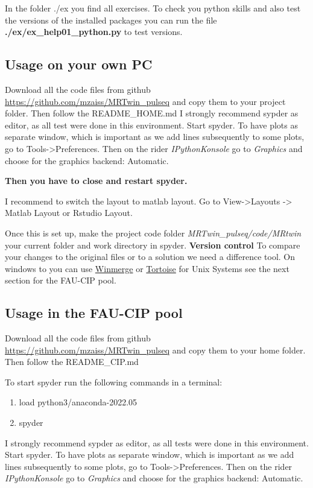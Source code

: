 \documentclass[a4paper,12pt]{extarticle}
\begin{document}
In the folder ./ex you find all exercises. 
To check you python skills and also test the versions of the installed packages you can run the file \textbf{./ex/ex\_help01\_python.py} to test versions.

\subsection{Usage on your own PC}
Download all the code files from github \href{https://github.com/mzaiss/MRTwin_pulseq}{https://github.com/mzaiss/MRTwin\_pulseq}   and copy them to your project folder.
Then follow the README\_HOME.md
I strongly recommend sypder as editor, as all test were done in this environment.
Start spyder.
To have plots as separate window, which is important as we add lines subsequently to some plots, go to Tools->Preferences. Then on the rider \emph{IPythonKonsole} go to \emph{Graphics} and choose for the graphics backend: Automatic. 

\textbf{Then you have to close and restart spyder.}

I recommend to switch the layout to matlab layout. Go to View->Layouts -> Matlab Layout or Rstudio Layout.

Once this is set up, make the project code folder \emph{MRTwin\_pulseq/code/MRtwin} your current folder and work directory in spyder. 
\textbf{Version control}
To compare your changes to the original files or to a solution we need a difference tool. On windows to you can use \href{https://winmerge.org/}{Winmerge} or \href{https://tortoisegit.org/}{Tortoise} for Unix Systems see the next section for the FAU-CIP pool.

\subsection{Usage in the FAU-CIP pool}\label{sec:spyder_cip}
Download all the code files from github \href{https://github.com/mzaiss/MRTwin_pulseq}{https://github.com/mzaiss/MRTwin\_pulseq}   and copy them to your home folder.
Then follow the README\_CIP.md

To start spyder run the following commands in a terminal:
\begin{enumerate}
\item load python3/anaconda-2022.05
\item spyder
\end{enumerate}

I strongly recommend sypder as editor, as all tests were done in this environment.
Start spyder.
To have plots as separate window, which is important as we add lines subsequently to some plots, go to Tools->Preferences. Then on the rider \emph{IPythonKonsole} go to \emph{Graphics} and choose for the graphics backend: Automatic.
\end{document}
